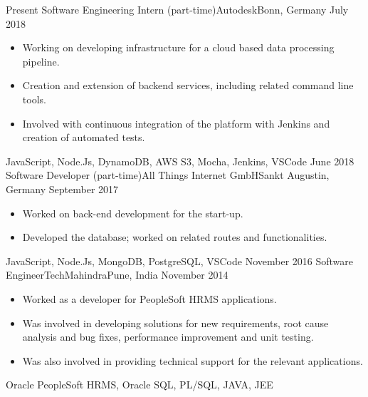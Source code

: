 %
%
%
\begin{experiences}
  \experience
    {Present}   {Software Engineering Intern (part-time)}{Autodesk}{Bonn, Germany}
    {July 2018} {
                      \begin{itemize}
                        \item Working on developing infrastructure for a cloud based data processing pipeline.
                        \item Creation and extension of backend services, including related command line tools.
                        \item Involved with continuous integration of the platform with Jenkins and creation of automated tests.                               
                      \end{itemize}
                    }
                    {JavaScript, Node.Js, DynamoDB, AWS S3, Mocha, Jenkins, VSCode}
  \emptySeparator
  \experience
    {June 2018} {Software Developer (part-time)}{All Things Internet GmbH}{Sankt Augustin, Germany}
    {September 2017}    {
                      \begin{itemize}
                        \item Worked on back-end development for the start-up.
                        \item Developed the database; worked on related routes and functionalities.                   
                      \end{itemize}
                    }
                    {JavaScript, Node.Js, MongoDB, PostgreSQL, VSCode}
  \emptySeparator
  \experience
    {November 2016}     {Software Engineer}{TechMahindra}{Pune, India}
    {November 2014}    {
                      \begin{itemize}
                        \item Worked as a developer for PeopleSoft HRMS applications.
                        \item Was involved in developing solutions for new requirements, root cause analysis and bug fixes, performance improvement and unit testing.
                        \item Was also involved in providing technical support for the relevant applications.
                      \end{itemize}
                    }
                    {Oracle PeopleSoft HRMS, Oracle SQL, PL/SQL, JAVA, JEE}
\end{experiences}
